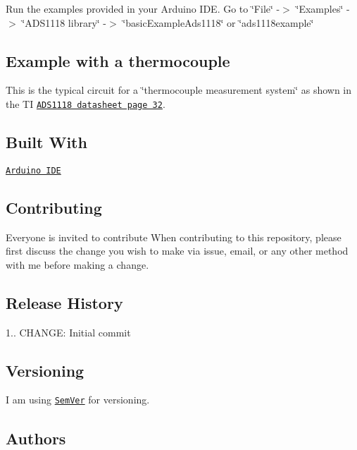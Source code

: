 \begin{DoxyEnumerate}
\item Run the examples provided in your Arduino I\+DE. Go to \char`\"{}\+File\char`\"{} -\/$>$ \char`\"{}\+Examples\char`\"{} -\/$>$ \char`\"{}\+A\+D\+S1118 library\char`\"{} -\/$>$ \char`\"{}basic\+Example\+Ads1118\char`\"{} or \char`\"{}ads1118example\char`\"{}
\end{DoxyEnumerate}

\subsection*{Example with a thermocouple}

This is the typical circuit for a \char`\"{}thermocouple measurement system\char`\"{} as shown in the TI \href{http://www.ti.com/lit/ds/symlink/ads1118.pdf}{\tt A\+D\+S1118 datasheet page 32}. 

\subsection*{Built With}


\begin{DoxyItemize}
\item \href{https://www.arduino.cc/}{\tt Arduino I\+DE}
\end{DoxyItemize}

\subsection*{Contributing}

Everyone is invited to contribute When contributing to this repository, please first discuss the change you wish to make via issue, email, or any other method with me before making a change.

\subsection*{Release History}

1.. C\+H\+A\+N\+GE\+: Initial commit

\subsection*{Versioning}

I am using \href{http://semver.org/}{\tt Sem\+Ver} for versioning.

\subsection*{Authors}


